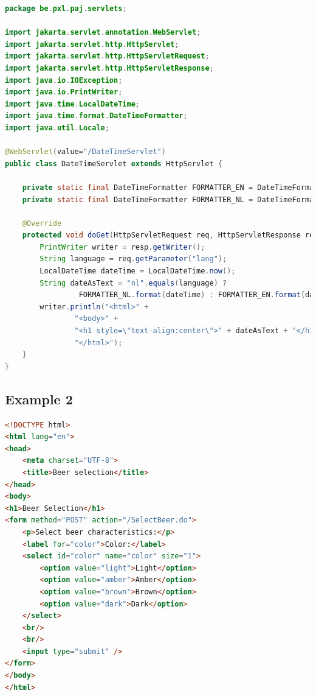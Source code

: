 \begin{lstlisting}[language=java, frame=single]
package be.pxl.paj.servlets;

import jakarta.servlet.annotation.WebServlet;
import jakarta.servlet.http.HttpServlet;
import jakarta.servlet.http.HttpServletRequest;
import jakarta.servlet.http.HttpServletResponse;
import java.io.IOException;
import java.io.PrintWriter;
import java.time.LocalDateTime;
import java.time.format.DateTimeFormatter;
import java.util.Locale;

@WebServlet(value="/DateTimeServlet")
public class DateTimeServlet extends HttpServlet {

	private static final DateTimeFormatter FORMATTER_EN = DateTimeFormatter.ofPattern("EEEE dd/MM/yyyy HH:mm:ss", Locale.ENGLISH);
	private static final DateTimeFormatter FORMATTER_NL = DateTimeFormatter.ofPattern("EEEE dd/MM/yyyy HH:mm:ss", new Locale("nl"));

	@Override
	protected void doGet(HttpServletRequest req, HttpServletResponse resp) throws IOException {
		PrintWriter writer = resp.getWriter();
		String language = req.getParameter("lang");
		LocalDateTime dateTime = LocalDateTime.now();
		String dateAsText = "nl".equals(language) ? 
		         FORMATTER_NL.format(dateTime) : FORMATTER_EN.format(dateTime);
		writer.println("<html>" +
				"<body>" +
				"<h1 style=\"text-align:center\">" + dateAsText + "</h1></body>" +
				"</html>");
	}
}
\end{lstlisting}


\subsection{Example 2}


\begin{lstlisting}[frame=single, language=html]
<!DOCTYPE html>
<html lang="en">
<head>
	<meta charset="UTF-8">
	<title>Beer selection</title>
</head>
<body>
<h1>Beer Selection</h1>
<form method="POST" action="/SelectBeer.do">
	<p>Select beer characteristics:</p>
	<label for="color">Color:</label>
	<select id="color" name="color" size="1">
		<option value="light">Light</option>
		<option value="amber">Amber</option>
		<option value="brown">Brown</option>
		<option value="dark">Dark</option>
	</select>
	<br/>
	<br/>
	<input type="submit" />
</form>
</body>
</html>
\end{lstlisting}

